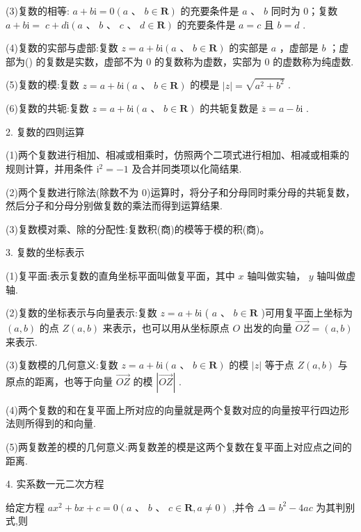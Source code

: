 \documentclass[10pt]{article}
\begin{document}
(3)复数的相等: \(a + b\mathrm{i} = 0\left( {a\text{ 、 }b \in  \mathbf{R}}\right)\) 的充要条件是 \(a\text{ 、 }b\) 同时为 0；复数 \(a + b\mathrm{i} = \; c + d\mathrm{i}\left( {a\text{ 、 }b\text{ 、 }c\text{ 、 }d \in  \mathbf{R}}\right)\) 的充要条件是 \(a = c\) 且 \(b = d\) .

(4)复数的实部与虚部:复数 \(z = a + b\mathrm{i}\left( {a\text{ 、 }b \in  \mathbf{R}}\right)\) 的实部是 \(a\) ，虚部是 \(b\) ；虚部为() 的复数是实数，虚部不为 0 的复数称为虚数，实部为 0 的虚数称为纯虚数.

(5)复数的模:复数 \(z = a + b\mathrm{i}\left( {a\text{ 、 }b \in  \mathbf{R}}\right)\) 的模是 \(\left| z\right|  = \sqrt{{a}^{2} + {b}^{2}}\) .

(6)复数的共轭:复数 \(z = a + b\mathrm{i}\left( {a\text{ 、 }b \in  \mathbf{R}}\right)\) 的共轭复数是 \(\overline{z} = a - b\mathrm{i}\) .

2. 复数的四则运算

(1)两个复数进行相加、相减或相乘时，仿照两个二项式进行相加、相减或相乘的规则计算，并用条件 \({\mathrm{i}}^{2} =  - 1\) 及合并同类项以化简结果.

(2)两个复数进行除法(除数不为 0)运算时，将分子和分母同时乘分母的共轭复数， 然后分子和分母分别做复数的乘法而得到运算结果.

(3)复数模对乘、除的分配性:复数积(商)的模等于模的积(商)。

3. 复数的坐标表示

(1)复平面:表示复数的直角坐标平面叫做复平面，其中 \(x\) 轴叫做实轴， \(y\) 轴叫做虚轴.

(2)复数的坐标表示与向量表示:复数 \(z = a + b\mathrm{i}\) ( \(a\text{ 、 }b \in  \mathbf{R}\) )可用复平面上坐标为 \(\left( {a,b}\right)\) 的点 \(Z\left( {a,b}\right)\) 来表示，也可以用从坐标原点 \(O\) 出发的向量 \(\overrightarrow{OZ} = \left( {a,b}\right)\) 来表示.

(3)复数模的几何意义:复数 \(z = a + b\mathrm{i}\left( {a\text{ 、 }b \in  \mathbf{R}}\right)\) 的模 \(\left| z\right|\) 等于点 \(Z\left( {a,b}\right)\) 与原点的距离，也等于向量 \(\overrightarrow{OZ}\) 的模 \(\left| \overrightarrow{OZ}\right|\) .

(4)两个复数的和在复平面上所对应的向量就是两个复数对应的向量按平行四边形法则所得到的和向量.

(5)两复数差的模的几何意义:两复数差的模是这两个复数在复平面上对应点之间的距离.

4. 实系数一元二次方程

给定方程 \(a{x}^{2} + {bx} + c = 0\left( {a\text{ 、 }b\text{ 、 }c \in  \mathbf{R},a \neq  0}\right)\) ,并令 \(\Delta  = {b}^{2} - {4ac}\) 为其判别式,则
\end{document}

